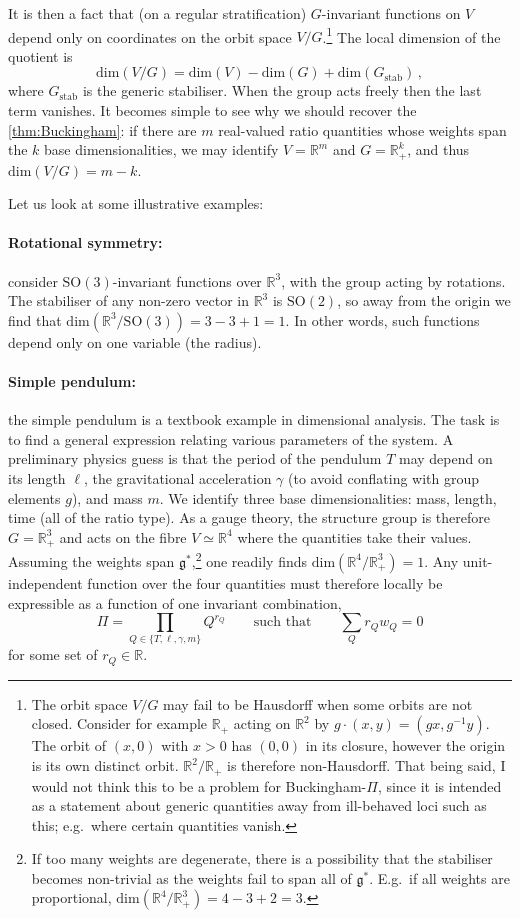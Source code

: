 \documentclass[12pt]{article}
\numberwithin{equation}{section}
\newcommand{\R}{\mathbb{R}}
\renewcommand{\dim}{\mathrm{dim}}
\begin{document}
It is then a fact that (on a regular stratification) $G$-invariant functions on $V$ depend only on coordinates on the orbit space $V\slash G$.\footnote{The orbit space $V\slash G$ may fail to be Hausdorff when some orbits are not closed. Consider for example $\R_+$ acting on $\R^2$ by $g\cdot (x,y)=(gx,g^{-1}y)$. The orbit of $(x,0)$ with $x>0$ has $(0,0)$ in its closure, however the origin is its own distinct orbit. $\R^2\slash \R_+$ is therefore non-Hausdorff. That being said, I would not think this to be a problem for Buckingham-$\Pi$, since it is intended as a statement about generic quantities away from ill-behaved loci such as this; e.g.~where certain quantities vanish.} The local dimension of the quotient is
\begin{equation}
    \mathrm{dim}(V\slash G)=\dim(V)-\dim(G)+\dim(G_\text{stab})\,,
\end{equation}
where $G_\text{stab}$ is the generic stabiliser. When the group acts freely then the last term vanishes. It becomes simple to see why we should recover the \cref{thm:Buckingham}: if there are $m$ real-valued ratio quantities whose weights span the $k$ base dimensionalities, we may identify $V=\R^m$ and $G=\R_+^k$, and thus $\dim(V\slash G)=m-k$.

Let us look at some illustrative examples:
\paragraph{Rotational symmetry:} consider $\mathrm{SO}(3)$-invariant functions over $\R^3$, with the group acting by rotations. The stabiliser of any non-zero vector in $\R^3$ is $\mathrm{SO}(2)$, so away from the origin we find that $\dim(\R^3\slash \mathrm{SO}(3))=3-3+1=1$. In other words, such functions depend only on one variable (the radius).

\paragraph{Simple pendulum:} the simple pendulum is a textbook example in dimensional analysis. The task is to find a general expression relating various parameters of the system. A preliminary physics guess is that the period of the pendulum $T$ may depend on its length $\ell$, the gravitational acceleration $\gamma$ (to avoid conflating with group elements $g$), and mass $m$. We identify three base dimensionalities: mass, length, time (all of the ratio type). As a gauge theory, the structure group is therefore $G=\R_+^3$ and acts on the fibre $V\simeq\R^4$ where the quantities take their values. Assuming the weights span $\mathfrak{g}^*$,\footnote{If too many weights are degenerate, there is a possibility that the stabiliser becomes non-trivial as the weights fail to span all of $\mathfrak{g}^*$. E.g.~if all weights are proportional, ${\dim(\R^4\slash\R_+^3)=4-3+2=3}$.} one readily finds $\dim(\R^4\slash \R_+^3)=1$. Any unit-independent function over the four quantities must therefore locally be expressible as a function of one invariant combination,
\begin{equation}
    \Pi = \prod_{Q\in \{T,\ell,\gamma,m\}} Q^{r_Q}\qquad\text{such that}\qquad \sum_Q r_Qw_Q=0
\end{equation}
for some set of $r_Q\in \R$. 
\end{document}
